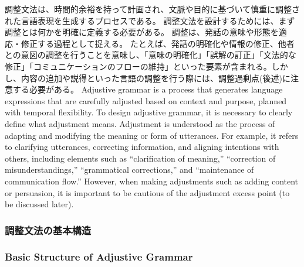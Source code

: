 \documentclass[a4paper,xelatex,ja=standard]{bxjsarticle}
\begin{document}
\ifJPN
調整文法は、時間的余裕を持って計画され、文脈や目的に基づいて慎重に調整された言語表現を生成するプロセスである。
調整文法を設計するためには、まず調整とは何かを明確に定義する必要がある。
調整は、発話の意味や形態を適応・修正する過程として捉える。
たとえば、発話の明確化や情報の修正、他者との意図の調整を行うことを意味し、「意味の明確化」「誤解の訂正」「文法的な修正」「コミュニケーションのフローの維持」といった要素が含まれる。しかし、内容の追加や説得といった言語の調整を行う際には、調整過剰点(後述)に注意する必要がある。
\else
Adjustive grammar is a process that generates language expressions that are carefully adjusted based on context and purpose, planned with temporal flexibility.
To design adjustive grammar, it is necessary to clearly define what adjustment means.
Adjustment is understood as the process of adapting and modifying the meaning or form of utterances.
For example, it refers to clarifying utterances, correcting information, and aligning intentions with others, including elements such as ``clarification of meaning,'' ``correction of misunderstandings,'' ``grammatical corrections,'' and ``maintenance of communication flow.'' However, when making adjustments such as adding content or persuasion, it is important to be cautious of the adjustment excess point (to be discussed later).
\fi

\ifJPN
\subsubsection{調整文法の基本構造}
\else
\subsubsection{Basic Structure of Adjustive Grammar}
\fi
\end{document}
